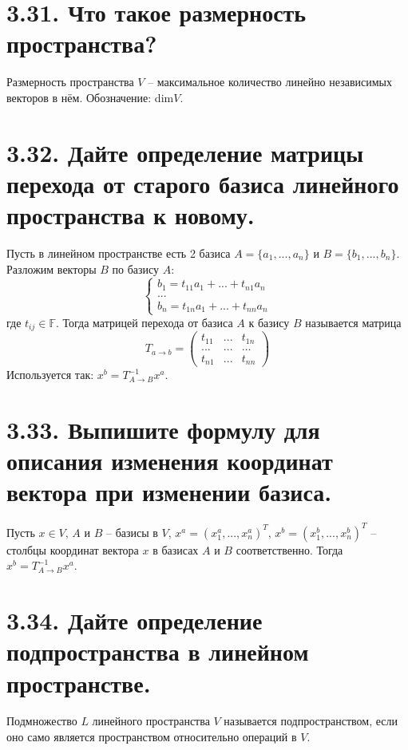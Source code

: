 \documentclass{article}
\begin{document}
\section*{\LARGE 3.31. Что такое размерность пространства? }
Размерность пространства $V$ -- максимальное количество линейно независимых векторов в нём. Обозначение: dim$V$.

\section*{\LARGE 3.32. Дайте определение матрицы перехода от старого базиса линейного пространства к новому. }
Пусть в линейном пространстве есть 2 базиса $A = \{a_1, ..., a_n\}$ и $B = \{b_1, ..., b_n\}$. Разложим векторы $B$ по базису $A$:
$$
\begin{cases}
b_1 = t_{11}a_1 + ... + t_{n1}a_n \\
... \\
b_n = t_{1n}a_1 + ... + t_{nn}a_n
\end{cases}
$$
где $t_{ij} \in \mathbb{F}$. Тогда матрицей перехода от базиса $A$ к базису $B$ называется матрица 
$$
T_{a \rightarrow b} = 
\begin{pmatrix}
t_{11} & ... & t_{1n} \\
... & ... & ... \\
t_{n1} & ... & t_{nn}
\end{pmatrix}
$$
Используется так: $x^b = T_{A \rightarrow B}^{-1} x^a$.

\section*{\LARGE 3.33. Выпишите формулу для описания изменения координат вектора при изменении базиса. }
Пусть $x \in V,\, A$ и $B$ -- базисы в $V, \, x^a = (x_1^a, ..., x_n^a)^T, \, x^b = (x_1^b, ..., x_n^b)^T$ -- столбцы координат вектора $x$ в базисах $A$ и $B$ соответственно. Тогда $x^b = T_{A \rightarrow B}^{-1} x^a$.

\section*{\LARGE 3.34. Дайте определение подпространства в линейном пространстве. }
Подмножество $L$ линейного пространства $V$ называется подпространством, если оно само является пространством относительно операций в $V$.
\end{document}
